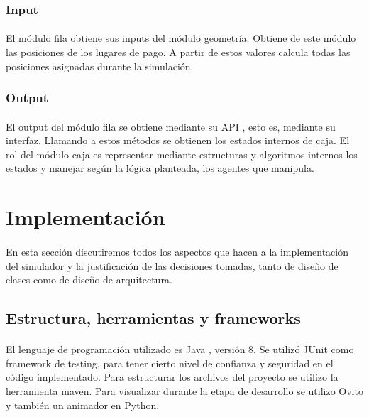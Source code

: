\documentclass{article}
\begin{document}
\subsubsection{Input}

\paragraph{}
El módulo fila obtiene sus inputs del módulo geometría. Obtiene de este módulo las posiciones de los lugares de pago. A partir de estos valores calcula todas las posiciones asignadas durante la simulación.

\subsubsection{Output}

\paragraph{}
El output del módulo fila se obtiene mediante su API , esto es, mediante su interfaz. Llamando a estos métodos se obtienen los estados internos de caja. El rol del módulo caja es representar mediante estructuras y algoritmos internos los estados y manejar según la lógica planteada, los agentes que manipula.


\section{Implementación}

\paragraph{}
En esta sección discutiremos todos los aspectos que hacen a la implementación del simulador y la justificación de las decisiones tomadas, tanto de diseño de clases como de diseño de arquitectura.

\subsection{Estructura, herramientas y frameworks}

\paragraph{}
El lenguaje de programación utilizado es Java , versión 8. Se utilizó JUnit como framework de testing, para tener cierto nivel de confianza y seguridad en el código implementado. Para estructurar los archivos del proyecto se utilizo la herramienta maven. Para visualizar durante la etapa de desarrollo se utilizo Ovito y también un animador en Python.
\end{document}
